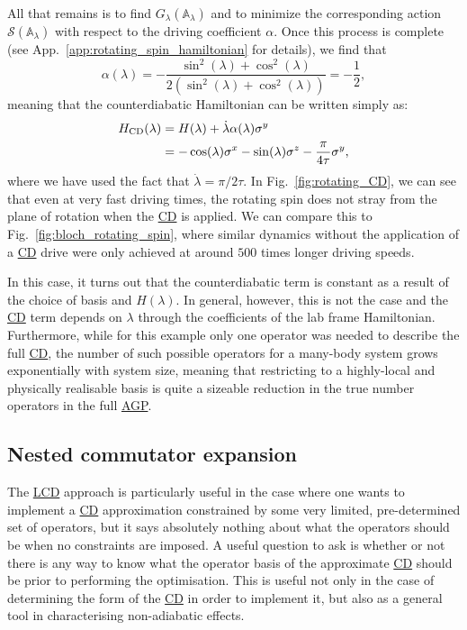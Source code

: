 \documentclass[a4paper,oneside,11pt]{book}
\newcommand{\sx}{\sigma^x}
\newcommand{\sy}{\sigma^y}
\newcommand{\sz}{\sigma^z}
\newcommand{\dotlambda}{\dot{\lambda}}
\newcommand{\approxAGP}{\mathbb{A}_{\lambda}}
\newcommand{\HCD}{H_{\rm CD}}
\newcommand{\acrref}[1]{\hyperref[acr:#1]{#1}}
\begin{document}
    All that remains is to find $G_{\lambda}(\approxAGP)$ and to minimize the corresponding action $\mathcal{S}(\approxAGP)$ with respect to the driving coefficient $\alpha$. Once this process is complete (see App.~\ref{app:rotating_spin_hamiltonian} for details), we find that
    \begin{equation}\label{eq:rotating_spin_alpha}
        \alpha(\lambda) = -\frac{\sin^2(\lambda) + \cos^2(\lambda)}{2(\sin^2(\lambda) + \cos^2(\lambda))} = - \frac{1}{2},
    \end{equation}
    meaning that the counterdiabatic Hamiltonian can be written simply as:
    \begin{equation}\label{eq:rotating_spin_HCD}
        \begin{aligned}
            \HCD(\lambda) &= H(\lambda) + \dotlambda \alpha(\lambda) \sy \\
            &= -\cos(\lambda)\sx - \sin(\lambda)\sz - \frac{\pi}{4 \tau} \sy,
        \end{aligned}
    \end{equation}
    where we have used the fact that $\dotlambda = \pi/2\tau$. In Fig.~\ref{fig:rotating_CD}, we can see that even at very fast driving times, the rotating spin does not stray from the plane of rotation when the \acrref{CD} is applied. We can compare this to Fig.~\ref{fig:bloch_rotating_spin}, where similar dynamics without the application of a \acrref{CD} drive were only achieved at around $500$ times longer driving speeds.

    In this case, it turns out that the counterdiabatic term is constant as a result of the choice of basis and $H(\lambda)$. In general, however, this is not the case and the \acrref{CD} term depends on $\lambda$ through the coefficients of the lab frame Hamiltonian. Furthermore, while for this example only one operator was needed to describe the full \acrref{CD}, the number of such possible operators for a many-body system grows exponentially with system size, meaning that restricting to a highly-local and physically realisable basis is quite a sizeable reduction in the true number operators in the full \acrref{AGP}.

    \subsection{Nested commutator expansion}\label{sec:2.4.2_nested_commutators}

    The \acrref{LCD} approach is particularly useful in the case where one wants to implement a \acrref{CD} approximation constrained by some very limited, pre-determined set of operators, but it says absolutely nothing about what the operators should be when no constraints are imposed. A useful question to ask is whether or not there is any way to know what the operator basis of the approximate \acrref{CD} should be prior to performing the optimisation. This is useful not only in the case of determining the form of the \acrref{CD} in order to implement it, but also as a general tool in characterising non-adiabatic effects.
\end{document}
